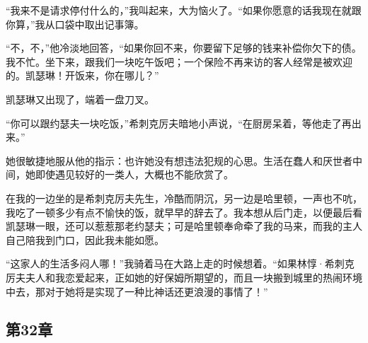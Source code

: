 \par “我来不是请求停付什么的，”我叫起来，大为恼火了。“如果你愿意的话我现在就跟你算，”我从口袋中取出记事簿。
\par “不，不，”他冷淡地回答，“如果你回不来，你要留下足够的钱来补偿你欠下的债。我不忙。坐下来，跟我们一块吃午饭吧；一个保险不再来访的客人经常是被欢迎的。凯瑟琳！开饭来，你在哪儿？”
\par 凯瑟琳又出现了，端着一盘刀叉。
\par “你可以跟约瑟夫一块吃饭，”希刺克厉夫暗地小声说，“在厨房呆着，等他走了再出来。”
\par 她很敏捷地服从他的指示：也许她没有想违法犯规的心思。生活在蠢人和厌世者中间，她即使遇见较好的一类人，大概也不能欣赏了。
\par 在我的一边坐的是希刺克厉夫先生，冷酷而阴沉，另一边是哈里顿，一声也不吭，我吃了一顿多少有点不愉快的饭，就早早的辞去了。我本想从后门走，以便最后看凯瑟琳一眼，还可以惹惹那老约瑟夫；可是哈里顿奉命牵了我的马来，而我的主人自己陪我到门口，因此我未能如愿。
\par “这家人的生活多闷人哪！”我骑着马在大路上走的时候想着。“如果林惇·希刺克厉夫夫人和我恋爱起来，正如她的好保姆所期望的，而且一块搬到城里的热闹环境中去，那对于她将是实现了一种比神话还更浪漫的事情了！”


\subsection{第32章}

